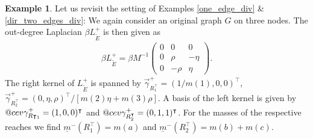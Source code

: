 \documentclass[reqno,12pt,letterpaper]{amsart}
\makeatletter
\numberwithin{equation}{section}
\newcommand{\Lout}{L^{+}}
\DeclareRobustCommand{\cev}[1]{%
	\mathpalette\do@cev{#1}%
}
\newcommand{\do@cev}[2]{%
	\fix@cev{#1}{+}%
	\reflectbox{$\m@th#1\vec{\reflectbox{$\fix@cev{#1}{-}\m@th#1#2\fix@cev{#1}{+}$}}$}%
	\fix@cev{#1}{-}%
}
\newcommand{\fix@cev}[2]{%
	\ifx#1\displaystyle
	\mkern#23mu
	\else
	\ifx#1\textstyle
	\mkern#23mu
	\else
	\ifx#1\scriptstyle
	\mkern#22mu
	\else
	\mkern#22mu
	\fi
	\fi
	\fi
}
\newcommand{\1}{\mathds{1}}
\theoremstyle{definition}
\newtheorem{Ex}[Th]{Example}
\makeatother
\begin{document}
	\medskip
	
	

	

\noindent		\begin{minipage}[b]{0.7\textwidth}
	\begin{Ex}\label{dir_two_edges_div_out}	Let us revisit the setting of Examples \ref{one_edge_div} \& \ref{dir_two_edges_div}:
		We again consider an original graph $G$ on three nodes. 
		The out-degree Laplacian $\beta \Lout_{\tilde{E}}$ is then given as 
		\begin{align}
			\beta	\Lout_{\tilde{E}} =   \beta  M^{-1}		\begin{pmatrix}
				0 & 0 & 0 \\
				0& \rho & -\eta \\
				0 & -\rho & \eta
			\end{pmatrix}.
		\end{align}
		The right kernel of $	\Lout_{\tilde{E}} $ is spanned by  $ \vec{\gamma}^{+}_{R^\intercal_1} = (1/m(1),0,0)^\intercal$, $\vec{\gamma}^{+}_{R^\intercal_2} =  (0,\eta,\rho)^\intercal/[m(2) \eta + m(3) \rho]$. A basis of the left kernel is given by $\cev{\gamma}^+_{R\intercal_1} = (1, 0 , 0)^\intercal$  and $\cev{\gamma}^+_{R^\intercal_2} = (0, 1 , 1)^\intercal$. \noindent For the masses of the respective reaches we find $\underline{m}^-(R^\intercal_1) = m(a)$ and $\underline{m}^-(R^\intercal_2) = m(b) + m(c)$. 
	\end{Ex}
\end{minipage}
\end{document}
